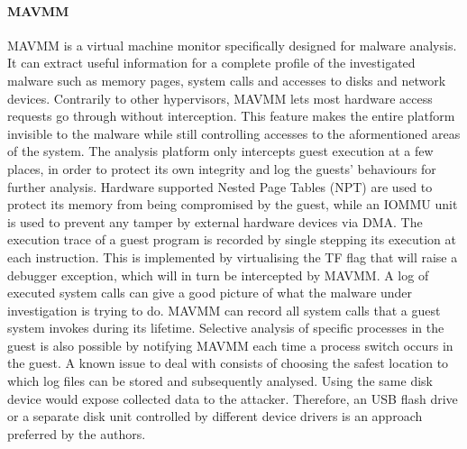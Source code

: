 \paragraph{MAVMM}
MAVMM \cite{MAVMM} is a virtual machine monitor specifically designed for malware analysis. It can extract useful information for a complete profile of the investigated malware such as memory pages, system calls and accesses to disks and network devices. Contrarily to other hypervisors, MAVMM lets most hardware access requests go through without interception. This feature makes the entire platform invisible to the malware while still controlling accesses to the aformentioned areas of the system. The analysis platform only intercepts guest execution at a few places, in order to protect its own integrity and log the guests' behaviours for further analysis. Hardware supported Nested Page Tables (NPT) are used to protect its memory from being compromised by the guest, while an IOMMU unit is used to prevent any tamper by external hardware devices via DMA.
The execution trace of a guest program is recorded by single stepping its execution at each instruction. This is implemented by virtualising the TF flag that will raise a debugger exception, which will in turn be intercepted by MAVMM. 
A log of executed system calls can give a good picture of what the malware under investigation is trying to do. MAVMM can record all system calls that a guest system invokes during its lifetime. Selective analysis of specific processes in the guest is also possible by notifying MAVMM each time a process switch occurs in the guest.
A known issue to deal with consists of choosing the safest location to which log files can be stored and subsequently analysed. Using the same disk device would expose collected data to the attacker. Therefore, an USB flash drive or a separate disk unit controlled by different device drivers is an approach preferred by the authors.



